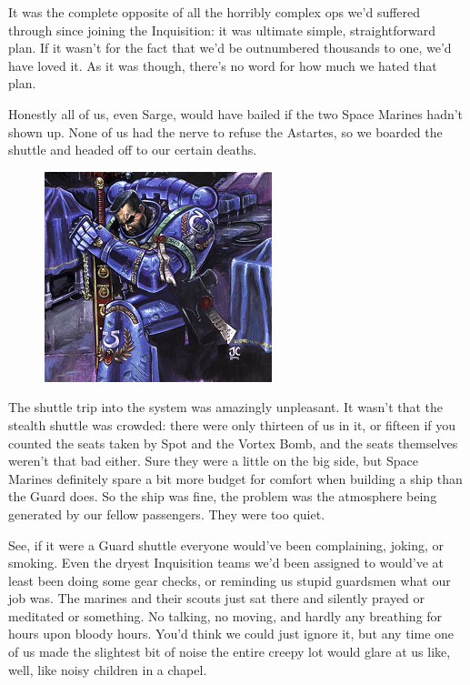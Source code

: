 It was the complete opposite of all the horribly complex ops we'd suffered through since joining the Inquisition: 
it was ultimate simple, straightforward plan. 
If it wasn't for the fact that we'd be outnumbered thousands to one, we'd have loved it. 
As it was though, there's no word for how much we hated that plan.

Honestly all of us, even Sarge, would have bailed if the two Space Marines hadn't shown up. 
None of us had the nerve to refuse the Astartes, so we boarded the shuttle and headed off to our certain deaths.
\begin{figure}
	\begin{center}
		\includegraphics[width=\figwidth]{pics/12/27.png}
	\end{center}
\end{figure}
The shuttle trip into the system was amazingly unpleasant. 
It wasn't that the stealth shuttle was crowded: 
there were only thirteen of us in it, or fifteen if you counted the seats taken by Spot and the Vortex Bomb, and the seats themselves weren't that bad either. 
Sure they were a little on the big side, but Space Marines definitely spare a bit more budget for comfort when building a ship than the Guard does. 
So the ship was fine, the problem was the atmosphere being generated by our fellow passengers. 
They were too quiet. 


See, if it were a Guard shuttle everyone would've been complaining, joking, or smoking. 
Even the dryest Inquisition teams we'd been assigned to would've at least been doing some gear checks, or reminding us stupid guardsmen what our job was. 
The marines and their scouts just sat there and silently prayed or meditated or something. 
No talking, no moving, and hardly any breathing for hours upon bloody hours. 
You'd think we could just ignore it, but any time one of us made the slightest bit of noise the entire creepy lot would glare at us like, well, like noisy children in a chapel.

